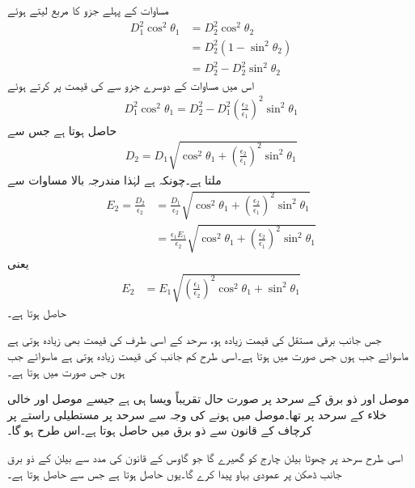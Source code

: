 مساوات  کے پہلے جزو کا مربع لیتے ہوئے
\begin{align*}
D_1^2 \cos^2 \theta_1&=D_2^2 \cos^2 \theta_2\\
&=D_2^2 (1-\sin^2 \theta_2)\\
&=D_2^2-D_2^2 \sin^2\theta_2
\end{align*}
اس میں مساوات  کے دوسرے جزو سے  کی قیمت پر کرتے ہوئے
\begin{align*}
D_1^2 \cos^2\theta_1=D_2^2-D_1^2 \left(\frac{\epsilon_2}{\epsilon_1}\right)^2\sin^2\theta_1
\end{align*}
حاصل ہوتا ہے جس سے
\begin{align}
D_2=D_1\sqrt{\cos^2\theta_1+\left(\frac{\epsilon_2}{\epsilon_1}\right)^2\sin^2\theta_1}
\end{align}
ملتا ہے۔چونکہ  ہے لہٰذا مندرجہ بالا مساوات سے
\begin{align*}
E_2=\frac{D_2}{\epsilon_2}&=\frac{D_1}{\epsilon_2}\sqrt{\cos^2\theta_1+\left(\frac{\epsilon_2}{\epsilon_1}\right)^2\sin^2\theta_1}\\
&=\frac{\epsilon_1 E_1}{\epsilon_2}\sqrt{\cos^2\theta_1+\left(\frac{\epsilon_2}{\epsilon_1}\right)^2\sin^2\theta_1}
\end{align*}
یعنی
\begin{align}
E_2&=E_1\sqrt{\left(\frac{\epsilon_1}{\epsilon_2} \right)^2\cos^2\theta_1+\sin^2\theta_1}
\end{align}
حاصل ہوتا ہے۔

جس جانب برقی مستقل کی قیمت  زیادہ ہو، سرحد کے اسی طرف  کی قیمت بھی زیادہ ہوتی ہے ماسوائے جب  ہوں جس صورت میں   ہوتا ہے۔اسی طرح کم  جانب  کی قیمت زیادہ ہوتی ہے ماسوائے جب  ہوں جس صورت میں  ہوتا ہے۔

موصل اور ذو برق کے سرحد پر صورت حال تقریباً ویسا ہی ہے جیسے موصل اور خالی خلاء کے سرحد پر تھا۔موصل میں  ہونے کی وجہ سے سرحد پر مستطیلی راستے پر کرچاف کے قانون سے ذو برق میں  حاصل ہوتا ہے۔اس طرح  ہو گا۔

اسی طرح سرحد پر چھوٹا بیلن  چارج کو گھیرے گا جو گاوس کے قانون کی مدد سے بیلن کے ذو برق جانب ڈھکن پر  عمودی بہاو  پیدا کرے گا۔یوں  حاصل ہوتا ہے جس سے  حاصل ہوتا ہے۔

